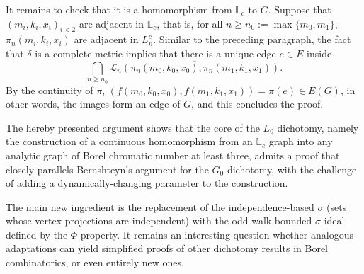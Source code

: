 It remains to check that it is a homomorphism from $\mathbb L_c$ to $G$.
Suppose that $(m_i,k_i,x_i)_{i<2}$ are adjacent in $\mathbb L_c$, that is, for all $n\geq n_0:=\max\{m_0,m_1\}$, $\pi_n(m_i,k_i,x_i)$ are adjacent in $L_n^c$.
Similar to the preceding paragraph, the fact that $\delta$ is a complete metric implies that there is a unique edge $e\in E$ inside $$\bigcap_{n\geq n_0}\overline{\mathcal L_n(\pi_n(m_0,k_0,x_0),\pi_n(m_1,k_1,x_1))}.$$
By the continuity of $\pi$, $(f(m_0,k_0,x_0),f(m_1,k_1,x_1))=\pi(e)\in E(G)$, in other words, the images form an edge of $G$, and this concludes the proof.

The hereby presented argument shows that the core of the $L_0$ dichotomy, namely the construction of a continuous homomorphism from an $\mathbb{L}_c$ graph into any analytic graph of Borel chromatic number at least three, admits a proof that closely parallels Bernshteyn's argument for the $G_0$ dichotomy, with the challenge of adding a dynamically-changing parameter to the construction.

The main new ingredient is the replacement of the independence-based $\sigma$ (sets whose vertex projections are independent) with the odd-walk-bounded $\sigma$-ideal defined by the $\Phi$ property.
It remains an interesting question whether analogous adaptations can yield simplified proofs of other dichotomy results in Borel combinatorics, or even entirely new ones.